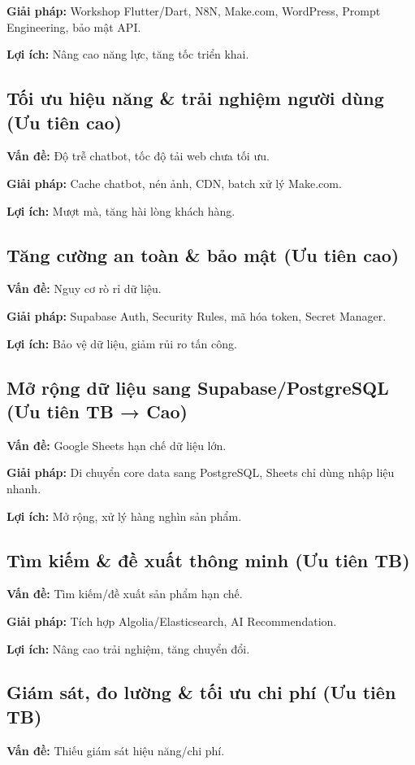 \textbf{Giải pháp:} Workshop Flutter/Dart, N8N, Make.com, WordPress, Prompt Engineering, bảo mật API.  

\textbf{Lợi ích:} Nâng cao năng lực, tăng tốc triển khai.  

\subsection{Tối ưu hiệu năng \& trải nghiệm người dùng (Ưu tiên cao)}
\textbf{Vấn đề:} Độ trễ chatbot, tốc độ tải web chưa tối ưu.  

\textbf{Giải pháp:} Cache chatbot, nén ảnh, CDN, batch xử lý Make.com. 

\textbf{Lợi ích:} Mượt mà, tăng hài lòng khách hàng.  

\subsection{Tăng cường an toàn \& bảo mật (Ưu tiên cao)}
\textbf{Vấn đề:} Nguy cơ rò rỉ dữ liệu.  

\textbf{Giải pháp:} Supabase Auth, Security Rules, mã hóa token, Secret Manager.  

\textbf{Lợi ích:} Bảo vệ dữ liệu, giảm rủi ro tấn công.  

\subsection{Mở rộng dữ liệu sang Supabase/PostgreSQL (Ưu tiên TB → Cao)}
\textbf{Vấn đề:} Google Sheets hạn chế dữ liệu lớn.  

\textbf{Giải pháp:} Di chuyển core data sang PostgreSQL, Sheets chỉ dùng nhập liệu nhanh.  

\textbf{Lợi ích:} Mở rộng, xử lý hàng nghìn sản phẩm.  

\subsection{Tìm kiếm \& đề xuất thông minh (Ưu tiên TB)}
\textbf{Vấn đề:} Tìm kiếm/đề xuất sản phẩm hạn chế.  

\textbf{Giải pháp:} Tích hợp Algolia/Elasticsearch, AI Recommendation. 

\textbf{Lợi ích:} Nâng cao trải nghiệm, tăng chuyển đổi.  

\subsection{Giám sát, đo lường \& tối ưu chi phí (Ưu tiên TB)}
\textbf{Vấn đề:} Thiếu giám sát hiệu năng/chi phí. 

